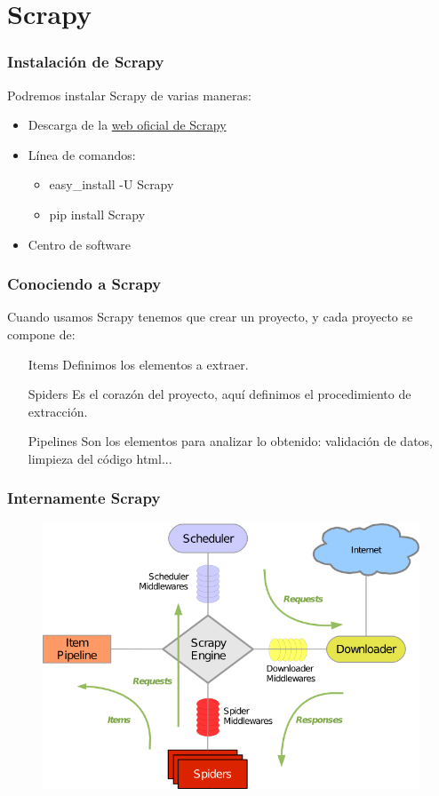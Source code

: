 \documentclass{beamer}
\begin{document}
	\section{Scrapy}
		\begin{frame}
			\frametitle{Instalación de Scrapy}
				Podremos instalar Scrapy de varias maneras:
				\begin{itemize}
					\item Descarga de la \href{http://scrapy.org/}{web oficial de Scrapy}
					\item Línea de comandos:\\
						\begin{itemize}
							\item easy\_install -U Scrapy
							\item pip install Scrapy
						\end{itemize}
					\item Centro de software
				\end{itemize}
		\end{frame}
		\begin{frame}
			\frametitle{Conociendo a Scrapy}
				Cuando usamos Scrapy tenemos que crear un proyecto, y cada proyecto se compone de:
				\begin{itemize}
					\item[Items] Definimos los elementos a extraer.
					\item[Spiders] Es el corazón del proyecto, aquí definimos el procedimiento de extracción.
					\item[Pipelines] Son los elementos para analizar lo obtenido: validación de datos, limpieza del código html...
				\end{itemize}
		\end{frame}
		\begin{frame}
			\frametitle{Internamente Scrapy}
			\begin{center}
				\begin{figure}
					\includegraphics[keepaspectratio=true, scale=0.5]{Imagenes/scrapy_architecture.png}
				\end{figure}
			\end{center}
		\end{frame}
\end{document}
